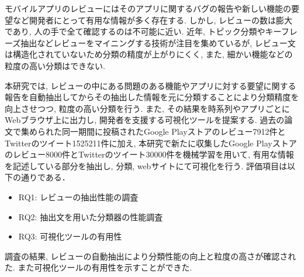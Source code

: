 
モバイルアプリのレビューにはそのアプリに関するバグの報告や新しい機能の要望など開発者にとって有用な情報が多く存在する. しかし, レビューの数は膨大であり, 人の手で全て確認するのは不可能に近い. 近年, トピック分類やキーフレーズ抽出などレビューをマイニングする技術が注目を集めているが, レビュー文は構造化されていないため分類の精度が上がりにくく, また, 細かい機能などの粒度の高い分類はできない. 

本研究では, レビューの中にある問題のある機能やアプリに対する要望に関する報告を自動抽出してからその抽出した情報を元に分類することにより分類精度を向上させつつ, 粒度の高い分類を行う. また, その結果を時系列やアプリごとにWebブラウザ上に出力し, 開発者を支援する可視化ツールを提案する.
過去の論文で集められた同一期間に投稿されたGoogle Playストアのレビュー7912件とTwitterのツイート1525211件に加え, 本研究で新たに収集したGoogle Playストアのレビュー8000件とTwitterのツイート30000件を機械学習を用いて, 有用な情報を記述している部分を抽出し, 分類, webサイトにて可視化を行う. 評価項目は以下の通りである．
\begin{itemize}
    \item RQ1: レビューの抽出性能の調査
    \item RQ2: 抽出文を用いた分類器の性能調査
    \item RQ3: 可視化ツールの有用性
\end{itemize}

調査の結果, レビューの自動抽出により分類性能の向上と粒度の高さが確認された. また可視化ツールの有用性を示すことができた. 
